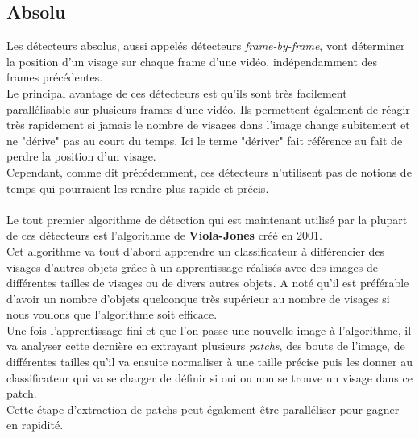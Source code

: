 \documentclass[poster]{polytech/polytech}
\begin{document}
\subsection{Absolu}
\label{absolu}
Les détecteurs absolus, aussi appelés détecteurs \textit{frame-by-frame}, vont déterminer la position d'un visage sur chaque frame d'une vidéo, indépendamment des frames précédentes.\\
Le principal avantage de ces détecteurs est qu'ils sont très facilement parallélisable sur plusieurs frames d'une vidéo. Ils permettent également de réagir très rapidement si jamais le nombre de visages dans l'image change subitement et ne "dérive" pas au court du temps. Ici le terme "dériver" fait référence au fait de perdre la position d'un visage.\\
Cependant, comme dit précédemment, ces détecteurs n'utilisent pas de notions de temps qui pourraient les rendre plus rapide et précis.\\
\\
Le tout premier algorithme de détection qui est maintenant utilisé par la plupart de ces détecteurs est l'algorithme de \textbf{Viola-Jones} \cite{violajones} créé en 2001.\\
Cet algorithme va tout d'abord apprendre un classificateur à différencier des visages d'autres objets grâce à un apprentissage réalisés avec des images de différentes tailles de visages ou de divers autres objets. A noté qu'il est préférable d'avoir un nombre d'objets quelconque très supérieur au nombre de visages si nous voulons que l'algorithme soit efficace.\\
Une fois l'apprentissage fini et que l'on passe une nouvelle image à l'algorithme, il va analyser cette dernière en extrayant plusieurs \textit{patchs}, des bouts de l'image, de différentes tailles qu'il va ensuite normaliser à une taille précise puis les donner au classificateur qui va se charger de définir si oui ou non se trouve un visage dans ce patch.\\
Cette étape d'extraction de patchs peut également être paralléliser pour gagner en rapidité.\\
\end{document}
